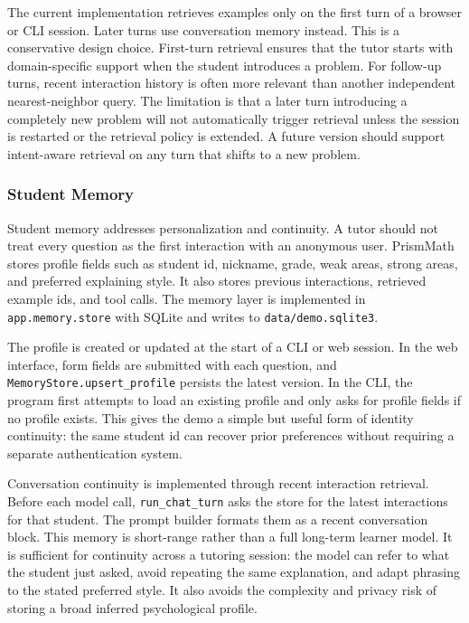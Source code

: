 The current implementation retrieves examples only on the first turn of a browser or CLI session. Later turns use conversation memory instead. This is a conservative design choice. First-turn retrieval ensures that the tutor starts with domain-specific support when the student introduces a problem. For follow-up turns, recent interaction history is often more relevant than another independent nearest-neighbor query. The limitation is that a later turn introducing a completely new problem will not automatically trigger retrieval unless the session is restarted or the retrieval policy is extended. A future version should support intent-aware retrieval on any turn that shifts to a new problem.

\subsubsection{Student Memory}

Student memory addresses personalization and continuity. A tutor should not treat every question as the first interaction with an anonymous user. PrismMath stores profile fields such as student id, nickname, grade, weak areas, strong areas, and preferred explaining style. It also stores previous interactions, retrieved example ids, and tool calls. The memory layer is implemented in \texttt{app.memory.store} with SQLite and writes to \texttt{data/demo.sqlite3}.

The profile is created or updated at the start of a CLI or web session. In the web interface, form fields are submitted with each question, and \texttt{MemoryStore.upsert\_profile} persists the latest version. In the CLI, the program first attempts to load an existing profile and only asks for profile fields if no profile exists. This gives the demo a simple but useful form of identity continuity: the same student id can recover prior preferences without requiring a separate authentication system.

Conversation continuity is implemented through recent interaction retrieval. Before each model call, \texttt{run\_chat\_turn} asks the store for the latest interactions for that student. The prompt builder formats them as a recent conversation block. This memory is short-range rather than a full long-term learner model. It is sufficient for continuity across a tutoring session: the model can refer to what the student just asked, avoid repeating the same explanation, and adapt phrasing to the stated preferred style. It also avoids the complexity and privacy risk of storing a broad inferred psychological profile.

